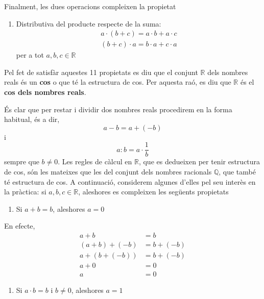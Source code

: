 Finalment, les dues operacions compleixen la propietat

\begin{enumerate}
\item[11.] Distributiva del producte respecte de la suma:%
\begin{equation*}
\begin{array}{c}
a\cdot (b+c)=a\cdot b+a\cdot c \\ 
(b+c)\cdot a=b\cdot a+c\cdot a%
\end{array}%
\end{equation*}%
per a tot $a,b,c\in \mathbb{R}$
\end{enumerate}

Pel fet de satisfàr aquestes 11 propietats es diu que el conjunt $%
\mathbb{R}$ dels nombres reals és un \textbf{cos} o que té la
estructura de cos. Per aquesta raó, es diu que $\mathbb{R}$ és el 
\textbf{cos dels nombres reals}.

És clar que per restar i dividir dos nombres reals procedirem en la
forma habitual, és a dir,%
\begin{equation*}
a-b=a+(-b)
\end{equation*}%
i%
\begin{equation*}
a:b=a\cdot \frac{1}{b}
\end{equation*}%
sempre que $b\neq 0$. Les regles de càlcul en $\mathbb{R}$, que es
dedueixen per tenir estructura de cos, són les mateixes que les del conjunt
dels nombres racionals $\mathbb{Q}$, que també té estructura
de cos. A continuació, considerem algunes d’elles pel seu interès en la pràctica: si $a,b,c\in \mathbb{R}$, aleshores es compleixen les
següents propietats

\begin{enumerate}
\item Si $a+b=b$, aleshores $a=0$
\end{enumerate}

En efecte, 
\begin{align*}
a+b &=b \\
\left( a+b\right) +(-b) &=b+(-b) \\
a+(b+(-b)) &=b+(-b) \\
a+0 &=0 \\
a &=0
\end{align*}

\begin{enumerate}
\item[2.] Si $a\cdot b=b$ i $b\neq 0$, aleshores $a=1$
\end{enumerate}

